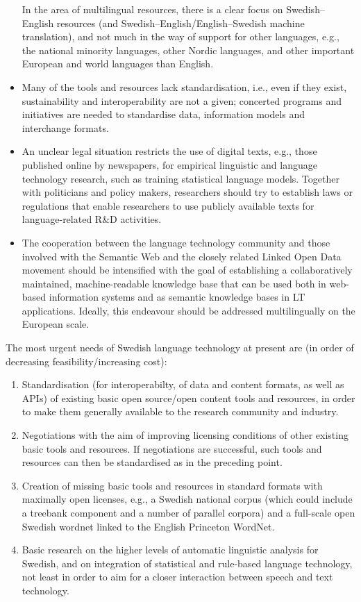 \begin{multicols}{2}
\begin{itemize}[itemsep=0pt,parsep=0pt]
In the area of multilingual resources, there is a clear focus on
  Swedish--English resources (and Swedish--English/English--Swedish
  machine translation), and not much in the way of support for other
  languages, e.g., the national minority languages, other Nordic
  languages, and other important European and world languages than
  English.
\item Many of the tools and resources lack standardisation, i.e., even
  if they exist, sustainability and interoperability are not a given;
  concerted programs and initiatives are needed to standardise data,
  information models and interchange formats.
\item An unclear legal situation restricts the use of digital texts,
  e.g., those published online by newspapers, for empirical
  linguistic and language technology research, such as training
  statistical language models. Together with politicians and policy
  makers, researchers should try to establish laws or regulations that
  enable researchers to use publicly available texts for
  language-related R\&D activities.
\item The cooperation between the language technology community and
  those involved with the Semantic Web and the closely related Linked
  Open Data movement should be intensified with the goal of
  establishing a collaboratively maintained, machine-readable
  knowledge base that can be used both in web-based information
  systems and as semantic knowledge bases in LT applications. Ideally,
  this endeavour should be addressed multilingually on the European
  scale.
\end{itemize}

The most urgent needs of Swedish language technology at present are
(in order of decreasing feasibility/increasing cost):
\begin{enumerate}[itemsep=0pt,parsep=0pt]
\item Standardisation (for interoperabilty, of data and content
  formats, as well as APIs) of existing basic open source/open content
  tools and resources, in order to make them generally available to
  the research community and industry.
\item Negotiations with the aim of improving licensing conditions of
  other existing basic tools and resources. If negotiations are
  successful, such tools and resources can then be standardised as in
  the preceding point.
\item Creation of missing basic tools and resources in standard
  formats with maximally open licenses, e.g., a Swedish national
  corpus (which could include a treebank component and a number of
  parallel corpora) and a full-scale open Swedish wordnet linked to
  the English Princeton WordNet.
\item Basic research on the higher levels of automatic linguistic
  analysis for Swedish, and on integration of statistical and
  rule-based language technology, not least in order to aim for a
  closer interaction between speech and text technology.
\end{enumerate}



\end{multicols}
